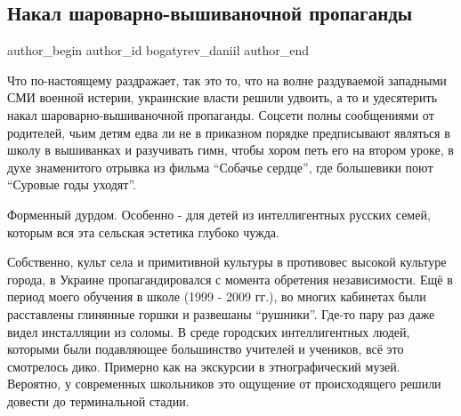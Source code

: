  
 
 
 
 
 
\subsection{Накал шароварно-вышиваночной пропаганды}
\label{sec:16_02_2022.tg.bogatyrev_daniil.1.nakal_propagandy}
 
\ifcmt
 author_begin
   author_id bogatyrev_daniil
 author_end
\fi

Что по-настоящему раздражает, так это то, что на волне раздуваемой западными
СМИ военной истерии, украинские власти решили удвоить, а то и удесятерить накал
шароварно-вышиваночной пропаганды. Соцсети полны сообщениями от родителей, чьим
детям едва ли не в приказном порядке предписывают являться в школу в вышиванках
и разучивать гимн, чтобы хором петь его на втором уроке, в духе знаменитого
отрывка из фильма \enquote{Собачье сердце}, где большевики поют
\enquote{Суровые годы уходят}.

Форменный дурдом. Особенно - для детей из интеллигентных русских семей, которым
вся эта сельская эстетика глубоко чужда.

Собственно, культ села и примитивной культуры в противовес высокой культуре
города, в Украине пропагандировался с момента обретения независимости. Ещё в
период моего обучения в школе (1999 - 2009 гг.), во многих кабинетах были
расставлены глинянные горшки и развешаны \enquote{рушники}. Где-то пару раз
даже видел инсталляции из соломы. В среде городских интеллигентных людей,
которыми были подавляющее большинство учителей и учеников, всё это смотрелось
дико. Примерно как на экскурсии в этнографический музей. Вероятно, у
современных школьников это ощущение от происходящего решили довести до
терминальной стадии.
